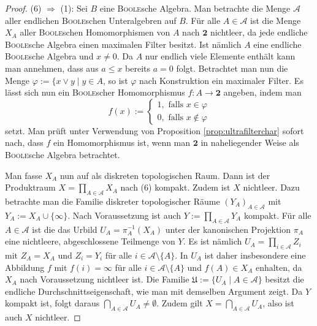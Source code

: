 \begin{proof}
  (6) $\Rightarrow$ (1):
  Sei $B$ eine \textsc{Boole}sche Algebra.
  Man betrachte die Menge $\mathcal{A}$ aller endlichen \textsc{Boole}schen Unteralgebren auf $B$.
  Für alle $A \in \mathcal{A}$ ist die Menge $X_A$ aller \textsc{Boole}schen Homomorphismen von $A$ nach $\mathbf{2}$ nichtleer, da jede endliche \textsc{Boole}sche Algebra einen maximalen Filter besitzt.
  Ist nämlich $A$ eine endliche \textsc{Boole}sche Algebra und $x \neq 0$.
  Da $A$ nur endlich viele Elemente enthält kann man annehmen, dass aus $a \leq x$ bereits $a = 0$ folgt.
  Betrachtet man nun die Menge $\varphi := \{x \lor y \mid y \in A$, so ist $\varphi$ nach Konstruktion ein maximaler Filter.
  Es lässt sich nun ein \textsc{Boole}scher Homomorphismus $f \colon A \to \mathbf{2}$ angeben, indem man 
  \begin{displaymath}
    f(x) := 
    \begin{cases}
      1, \text{ falls } x \in \varphi \\
      0, \text{ falls } x \not\in \varphi
    \end{cases}
  \end{displaymath}
  setzt.
  Man prüft unter Verwendung von Proposition \ref{prop:ultrafilterchar} sofort nach, dass $f$ ein Homomorphismus ist, wenn man $\mathbf{2}$ in naheliegender Weise als \textsc{Boole}sche Algebra betrachtet.

  Man fasse $X_A$ nun auf als diskreten topologischen Raum.
  Dann ist der Produktraum $X = \prod_{A \in \mathcal{A}} X_A$ nach (6) kompakt.
  Zudem ist $X$ nichtleer.
  Dazu betrachte man die Familie diskreter topologischer Räume $(Y_A)_{A \in \mathcal{A}}$ mit $Y_A := X_A \cup \{\infty\}$.
  Nach Voraussetzung ist auch $Y := \prod_{A \in \mathcal{A}} Y_A$ kompakt.
  Für alle $A \in \mathcal{A}$ ist die das Urbild $U_A = \pi_A^{-1}(X_A)$ unter der kanonischen Projektion $\pi_A$ eine nichtleere, abgeschlossene Teilmenge von $Y$.
  Es ist nämlich $U_A = \prod_{i \in \mathcal{A}} Z_i$ mit $Z_A = X_A$ und $Z_i = Y_i$ für alle $i \in \mathcal{A} \setminus \{A\}$.
  In $U_A$ ist daher insbesondere eine Abbildung $f$ mit $f(i) = \infty$ für alle $i \in \mathcal{A} \setminus \{A\}$ und $f(A) \in X_A$ enhalten, da $X_A$ nach Voraussetzung nichtleer ist.
  Die Familie $\mathfrak{U} := \{U_A \mid A \in \mathcal{A}\}$ besitzt die endliche Durchschnittseigenschaft, wie man mit demselben Argument zeigt.
  Da $Y$ kompakt ist, folgt daraus $\bigcap_{A \in \mathcal{A}} U_A \neq \emptyset$.
  Zudem gilt $X = \bigcap_{A \in \mathcal{A}} U_A$, also ist auch $X$ nichtleer.


\end{proof}
